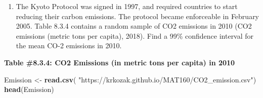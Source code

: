 \documentclass[
]{book}
\newenvironment{Shaded}{\begin{snugshade}}{\end{snugshade}}
\newcommand{\KeywordTok}[1]{\textcolor[rgb]{0.13,0.29,0.53}{\textbf{#1}}}
\newcommand{\NormalTok}[1]{#1}
\newcommand{\StringTok}[1]{\textcolor[rgb]{0.31,0.60,0.02}{#1}}
\providecommand{\tightlist}{%
  \setlength{\itemsep}{0pt}\setlength{\parskip}{0pt}}
\begin{document}
\begin{enumerate}
\def\labelenumi{\arabic{enumi}.}
\tightlist
\item
  The Kyoto Protocol was signed in 1997, and required countries to start reducing their carbon emissions. The protocol became enforceable in February 2005. Table 8.3.4 contains a random sample of CO2 emissions in 2010 (CO2 emissions (metric tons per capita), 2018). Find a 99\% confidence interval for the mean CO-2 emissions in 2010.
\end{enumerate}

\textbf{Table \#8.3.4: CO2 Emissions (in metric tons per capita) in 2010}

\begin{Shaded}
\begin{Highlighting}[]
\NormalTok{Emission <-}\StringTok{ }\KeywordTok{read.csv}\NormalTok{(}
  \StringTok{"https://krkozak.github.io/MAT160/CO2_emission.csv"}\NormalTok{)}
\KeywordTok{head}\NormalTok{(Emission)}
\end{Highlighting}
\end{Shaded}
\end{document}
